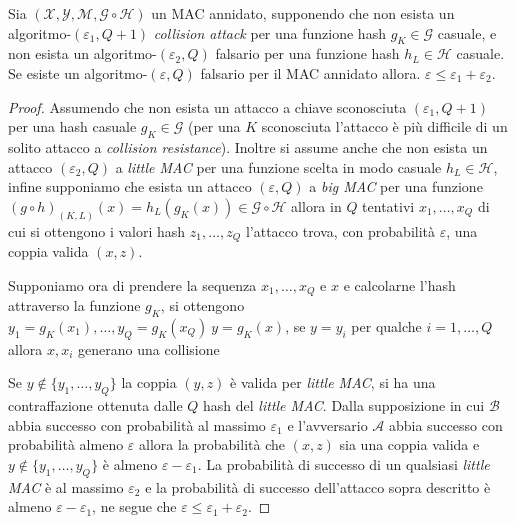 \begin{theorem}
    Sia $(\mathcal{X},\mathcal{Y},\mathcal{M},\mathcal{G} \circ  \mathcal{H})$ un MAC annidato, supponendo che non esista un algoritmo-$(\varepsilon_1,Q+1)$ \textit{collision attack} per una funzione hash $g_K \in \mathcal{G}$ casuale, e non esista un algoritmo-$(\varepsilon_2,Q)$ falsario per una funzione hash $h_L \in \mathcal{H}$ casuale. Se esiste un algoritmo-$(\varepsilon,Q)$ falsario per il MAC annidato allora. $\varepsilon \leq \varepsilon_1 + \varepsilon_2$.
\end{theorem}

\begin{proof}
    
    Assumendo che non esista un attacco a chiave sconosciuta $(\varepsilon_1,Q+1)$ per una hash casuale $g_K \in \mathcal{G}$ (per una $K$ sconosciuta l'attacco è più difficile di un solito attacco a \emph{collision resistance}). Inoltre si assume anche che non esista un attacco $(\varepsilon_2, Q)$ a \emph{little MAC} per una funzione scelta in modo casuale $h_L \in \mathcal{H}$, infine supponiamo che esista un attacco $(\varepsilon,Q)$ a \emph{big MAC} per una funzione $(g \circ h)_{(K,L)}(x) = h_L(g_K(x)) \in \mathcal{G} \circ \mathcal{H}$ allora in $Q$ tentativi $x_1,\dots,x_Q$ di cui si ottengono i valori hash $z_1,\dots,z_Q$ l'attacco trova, con probabilità $\varepsilon$, una coppia valida $(x,z)$. 

    \noindent
    Supponiamo ora di prendere la sequenza $x_1,\dots,x_Q$ e $x$ e calcolarne l'hash attraverso la funzione $g_K$, si ottengono $y_1 = g_K(x_1),\dots,y_Q = g_K(x_Q)\ y = g_K(x)$, se $y = y_i$ per qualche $i = 1,\dots,Q$ allora $x,x_i$ generano una collisione
    
    \vspace{1em}
    Se $y \notin \{y_1,\dots,y_Q\}$ la coppia $(y,z)$ è valida per \textit{little MAC}, si ha una contraffazione ottenuta dalle $Q$ hash del \textit{little MAC}. Dalla supposizione in cui $\mathcal{B}$ abbia successo con probabilità al massimo $\varepsilon_1$ e l'avversario $\mathcal{A}$ abbia successo con probabilità almeno $\varepsilon$ allora la probabilità che $(x,z)$ sia una coppia valida e $y \notin \{y_1,\dots,y_Q\}$ è almeno $\varepsilon - \varepsilon_1$. La probabilità di successo di un qualsiasi \textit{little MAC} è al massimo $\varepsilon_2$ e la probabilità di successo dell'attacco sopra descritto è almeno $\varepsilon - \varepsilon_1$, ne segue che $\varepsilon \leq \varepsilon_1 + \varepsilon_2$.
\end{proof}

